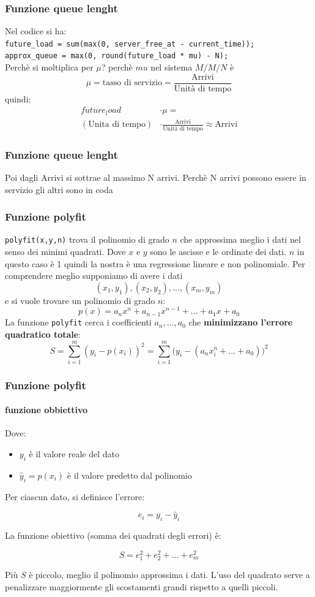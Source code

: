 \documentclass{beamer}
\begin{document}
\begin{frame}
    \frametitle{Funzione queue lenght}
    Nel codice si ha:\\
    \texttt{future\_load = sum(max(0, server\_free\_at - current\_time));}\\
    \texttt{approx\_queue = max(0, round(future\_load * mu) - N);}\\
    Perchè si moltiplica per $\mu$?
    perchè $mu$ nel sistema $M/M/N$ è \[\mu=\text{tasso di servizio}=\frac{\text{Arrivi}}{\text{Unità di tempo}}\]
    quindi:
    \begin{align}
        future_load&\cdot \mu=\\
        (\text{Unita di tempo})&\cdot \frac{\text{Arrivi}}{\text{Unità di tempo}}\approx \text{Arrivi}
    \end{align}
\end{frame}
   
\begin{frame}
    \frametitle{Funzione queue lenght}
    Poi dagli Arrivi si sottrae al massimo N arrivi. Perchè N arrivi possono essere in servizio gli altri sono in coda 
\end{frame}

\begin{frame}
    \frametitle{Funzione polyfit}
    \texttt{polyfit(x,y,n)} trova il polinomio di grado $n$ che approssima meglio i dati nel senso dei minimi quadrati. Dove $x$ e $y$ sono le ascisse e le ordinate dei dati.
    $n$ in questo caso è 1 quindi la nostra è una regressione lineare e non polinomiale.
    Per comprendere meglio supponiamo di avere i dati
    \[
    (x_1, y_1), (x_2, y_2), \dots, (x_m, y_m)
    \]
    e si vuole trovare un polinomio di grado $n$:
    \[
    p(x) = a_n x^n + a_{n-1} x^{n-1} + \dots + a_1 x + a_0
    \]
    La funzione \texttt{polyfit} cerca i coefficienti $a_n, \dots, a_0$ che \textbf{minimizzano l'errore quadratico totale}:
    \[
    S = \sum_{i=1}^{m} (y_i - p(x_i))^2 
    = \sum_{i=1}^{m} \big( y_i - (a_n x_i^n + \dots + a_0) \big)^2
    \]
\end{frame}

\begin{frame}
    \frametitle{Funzione polyfit}
    \framesubtitle{funzione obbiettivo}

    Dove:
    \begin{itemize}
        \item $y_i$ è il valore reale del dato
        \item $\hat{y}_i = p(x_i)$ è il valore predetto dal polinomio
    \end{itemize}

    Per ciascun dato, si definisce l'errore:

    \[
    e_i = y_i - \hat{y}_i
    \]

    La funzione obiettivo (somma dei quadrati degli errori) è:

    \[
    S = e_1^2 + e_2^2 + \dots + e_m^2
    \]

    Più $S$ è piccolo, meglio il polinomio approssima i dati.  
    L'uso del quadrato serve a penalizzare maggiormente gli scostamenti grandi rispetto a quelli piccoli.
\end{frame}
\end{document}
